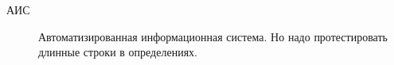 \Abbreviations %
\begin{description}
\item[АИС] Автоматизированная информационная система. Но надо протестировать длинные строки в определениях.
\end{description}


